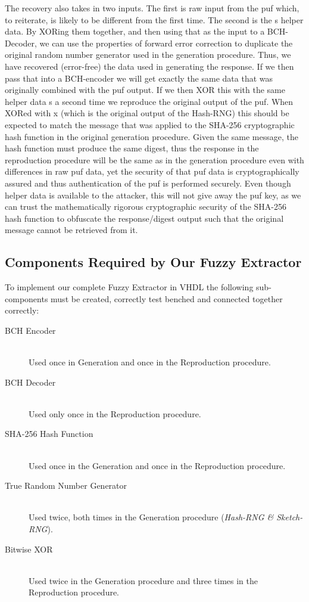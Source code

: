 The recovery also takes in two inputs. The first is raw input from the \gls{puf}
which, to reiterate, is likely to be different from the first time.
The second is the s helper data. By XORing them together, and then using that
as the input to a BCH-Decoder, we can use the properties of forward error
correction to duplicate the original random number generator used in the
generation procedure.
Thus, we have recovered (error-free) the data used in generating the
response.
If we then pass that into a BCH-encoder we will get exactly the same data that
was originally combined with the \gls{puf} output.
If we then XOR this with the same helper data s a second time we reproduce the
original output of the \gls{puf}.
When XORed with x (which is the original output of the Hash-RNG) this should
be expected to match the message that was applied to the SHA-256 cryptographic
hash function in the original generation procedure.
Given the same message, the hash function must produce the same digest,
thus the response in the reproduction procedure will be the same as in the
generation procedure even with differences in raw \gls{puf} data,
yet the security of that \gls{puf} data is cryptographically assured and thus
authentication of the \gls{puf} is performed securely.
Even though helper data is available to the attacker, this will not give away
the \gls{puf} key, as we can trust the mathematically rigorous cryptographic security
of the SHA-256 hash function to obfuscate the response/digest output such that
the original message cannot be retrieved from it.

\subsection{Components Required by Our Fuzzy Extractor}

To implement our complete Fuzzy Extractor in VHDL the following sub-components
must be created, correctly test benched and connected together correctly:

\begin{description}
\item[BCH Encoder] \hfill \\
Used once in Generation and once in the Reproduction procedure.
\item[BCH Decoder] \hfill \\
Used only once in the Reproduction procedure.
\item[SHA-256 Hash Function] \hfill \\
Used once in the Generation and once in the Reproduction procedure.
\item[True Random Number Generator] \hfill \\
Used twice, both times in the Generation procedure
(\emph{Hash-RNG \& Sketch-RNG}).
\item[Bitwise XOR] \hfill \\
Used twice in the Generation procedure and 
three times in the Reproduction procedure.
\end{description}

